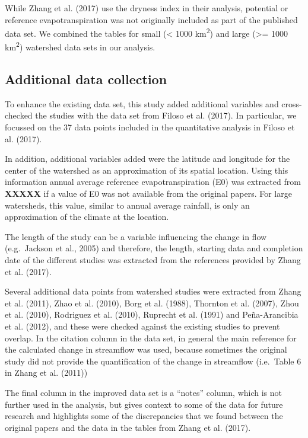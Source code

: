 \documentclass[]{elsarticle} %
\begin{document}
While Zhang et al. (2017) use the dryness index in their analysis,
potential or reference evapotranspiration was not originally included as
part of the published data set. We combined the tables for small
(\textless{} 1000 km\textsuperscript{2}) and large (\textgreater= 1000
km\textsuperscript{2}) watershed data sets in our analysis.

\hypertarget{additional-data-collection}{%
\subsection{Additional data
collection}\label{additional-data-collection}}

To enhance the existing data set, this study added additional variables
and cross-checked the studies with the data set from Filoso et al.
(2017). In particular, we focussed on the 37 data points included in the
quantitative analysis in Filoso et al. (2017).

In addition, additional variables added were the latitude and longitude
for the center of the watershed as an approximation of its spatial
location. Using this information annual average reference
evapotranspiration (E0) was extracted from \textbf{XXXXX} if a value of
E0 was not available from the original papers. For large watersheds,
this value, similar to annual average rainfall, is only an approximation
of the climate at the location.

The length of the study can be a variable influencing the change in flow
(e.g.~Jackson et al., 2005) and therefore, the length, starting data and
completion date of the different studies was extracted from the
references provided by Zhang et al. (2017).

Several additional data points from watershed studies were extracted
from Zhang et al. (2011), Zhao et al. (2010), Borg et al. (1988),
Thornton et al. (2007), Zhou et al. (2010), Rodriguez et al. (2010),
Ruprecht et al. (1991) and Peña-Arancibia et al. (2012), and these were
checked against the existing studies to prevent overlap. In the citation
column in the data set, in general the main reference for the calculated
change in streamflow was used, because sometimes the original study did
not provide the quantification of the change in streamflow (i.e.~Table 6
in Zhang et al. (2011))

The final column in the improved data set is a ``notes'' column, which
is not further used in the analysis, but gives context to some of the
data for future research and highlights some of the discrepancies that
we found between the original papers and the data in the tables from
Zhang et al. (2017).
\end{document}
